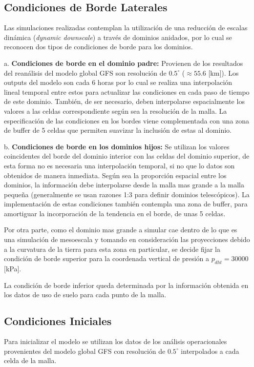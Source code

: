 \subsection{Condiciones de Borde Laterales}
Las simulaciones realizadas contemplan la utilización de una reducción de escalas dinámica (\emph{dynamic downscale}) a través de dominios anidados, por lo cual se reconocen dos tipos de condiciones de borde para los dominios.
\begin{enumerate*}
	\item[a.] \textbf{Condiciones de borde en el dominio padre:} Provienen de los resultados del reanálisis del modelo global GFS son resolución de $0.5^\circ$ ($\approx 55.6$ [km]). Los outputs del modelo son cada 6 horas por lo cual se realiza una interpolación lineal temporal entre estos para actualizar las condiciones en cada paso de tiempo de este dominio. También, de ser necesario, deben interpolarse espacialmente los valores a las celdas correspondiente según sea la resolución de la malla. La especificación de las condiciones en los bordes viene complementada con una zona de buffer de 5 celdas que permiten suavizar la inclusión de estas al dominio.
	\item[b.] \textbf{Condiciones de borde en los dominios hijos:} Se utilizan los valores coincidentes del borde del dominio interior con las celdas del dominio superior, de esta forma no es necesaria una interpolación temporal, si no que lo datos son obtenidos de manera inmediata. Según sea la proporción espacial entre los dominios, la información debe interpolarse desde la malla mas grande a la malla pequeña (generalmente se usan razones 1:3 para definir dominios telescópicos). La implementación de estas condiciones también contempla una zona de buffer, para amortiguar la incorporación de la tendencia en el borde, de unas 5 celdas.
\end{enumerate*}
Por otra parte, como el dominio mas grande a simular cae dentro de lo que es una simulación de mesoescala y tomando en consideración las proyecciones debido a la curvatura de la tierra para esta zona en particular, se decide fijar la condición de borde superior para la coordenada vertical de presión a $p_{dht} = 30000$ [kPa].

La condición de borde inferior queda determinada por la información obtenida en los datos de uso de suelo para cada punto de la malla.
\subsection{Condiciones Iniciales}
Para inicializar el modelo se utilizan los datos de los análisis operacionales provenientes del modelo global GFS con resolución de $0.5^\circ$ interpolados a cada celda de la malla.

